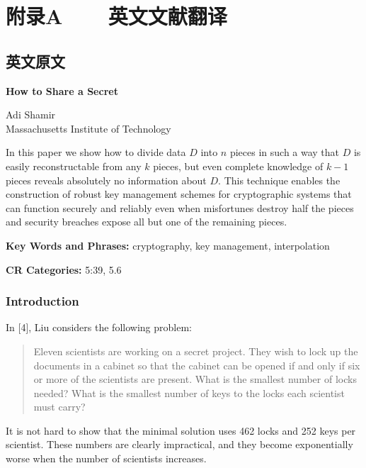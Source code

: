 \chapter{附录A\ \ \ \ 英文文献翻译}

\section{英文原文}

\begin{center}
	\Large\textbf{How to Share a Secret}

	\vspace{0.5cm}
	\large Adi Shamir\\
	Massachusetts Institute of Technology
\end{center}

\vspace{0.5cm}

In this paper we show how to divide data $D$ into $n$ pieces
in such a way that $D$ is easily reconstructable from any $k$
pieces, but even complete knowledge of $k - 1$ pieces reveals
absolutely no information about $D$. This technique enables the
construction of robust key management schemes for cryptographic
systems that can function securely and reliably even when misfortunes
destroy half the pieces and security breaches expose all
but one of the remaining pieces.

\vspace{0.3cm}
\noindent\textbf{Key Words and Phrases:} cryptography, key management, interpolation

\noindent\textbf{CR Categories:} 5:39, 5.6

\subsection{Introduction}
In [4], Liu considers the following problem:
\begin{quote}
	Eleven scientists are working on a secret project.
	They wish to lock up the documents in a cabinet so that the
	cabinet can be opened if and only if six or more of the
	scientists are present. What is the smallest number of locks needed?
	What is the smallest number of keys to the locks each scientist must carry?
\end{quote}

It is not hard to show that the minimal solution uses 462 locks and
252 keys per scientist. These numbers are clearly impractical,
and they become exponentially worse when the number of scientists increases.

